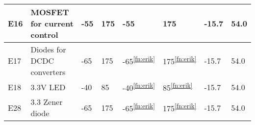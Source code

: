 \begin{longtable}{|m{1cm}|m{3.5cm}|m{1.3cm}|m{1.3cm}|m{1.4cm}|m{1.3cm}|m{1.3cm}|m{1.3cm}|}
E16 & MOSFET for current control & -55 & 175 & -55 & 175 & -15.7 & 54.0 \\ \hline
E17 & Diodes for DCDC converters & -65 & 175 & -65\textsuperscript{\ref{fn:erik}} & 175\textsuperscript{\ref{fn:erik}} & -15.7 & 54.0 \\ \hline
E18 & 3.3V LED & -40 & 85 & -40\textsuperscript{\ref{fn:erik}} & 85\textsuperscript{\ref{fn:erik}} & -15.7 & 54.0 \\ \hline 
E28 & 3.3 Zener diode & -65 & 175 & -65\textsuperscript{\ref{fn:erik}} & 175\textsuperscript{\ref{fn:erik}} & -15.7 & 54.0 \\ \hline

\end{longtable}
